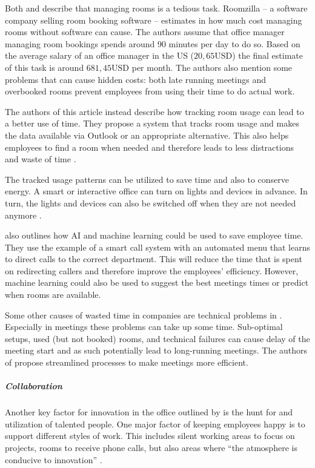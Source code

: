 Both \cite{iotagenda} and \cite{roomzilla9} describe that managing rooms is a tedious task. 
Roomzilla -- a software company selling room booking software -- estimates in \cite{roomzilla9} how 
much cost managing rooms without software can cause. The authors assume that office manager managing 
room bookings spends around 90 minutes per day to do so. Based on the average salary of an office 
manager in the US (\(20,65\text{USD}\)) the final estimate of this task is around \(681,45\text{USD}\) 
per month. The authors also mention some problems that can cause hidden costs: both late running 
meetings and overbooked rooms prevent employees from using their time to do actual work. 

The authors of this article instead describe how tracking room usage can lead to a better use of 
time. They propose a system that tracks room usage and makes the data available via Outlook or an 
appropriate alternative. This also helps employees to find a room when needed and therefore leads to 
less distractions and waste of time \cite{iotagenda}.

The tracked usage patterns can be utilized to save time and also to conserve energy. A smart or 
interactive office can turn on lights and devices in advance. In turn, the lights and devices can 
also be switched off when they are not needed anymore \cite{hbcommunications}.


\cite{hbcommunications} also outlines how AI and machine learning could be used to save employee 
time. They use the example of a smart call system with an automated menu that learns to direct calls 
to the correct department. This will reduce the time that is spent on redirecting callers and 
therefore improve the employees' efficiency. However, machine learning could also be used to suggest 
the best meetings times or predict when rooms are available.

Some other causes of wasted time in companies are technical problems in \cite{roomzilla3}. 
Especially in meetings these problems can take up some time. Sub-optimal setups, used (but not 
booked) rooms, and technical failures can cause delay of the meeting start and as such potentially 
lead to long-running meetings. The authors of \cite{roomzilla3} propose streamlined processes to 
make meetings more efficient. 

\subparagraph{Collaboration}\label{sec:sda-collaboration}
Another key factor for innovation in the office outlined by \cite{hub13} is the hunt for and 
utilization of talented people. One major factor of keeping employees happy is to support different 
styles of work. This includes silent working areas to focus on projects, rooms to receive phone 
calls, but also areas where ``the atmosphere is conducive to innovation'' \cite{tieto}.

